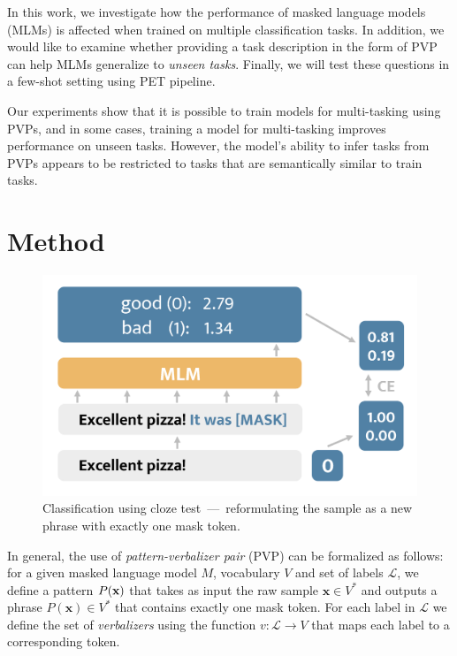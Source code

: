 \documentclass[11pt,a4paper]{article}
\begin{document}
In this work, we investigate how the performance of masked language models (MLMs) is affected when trained on multiple classification tasks.
In addition, we would like to examine whether providing a task description in the form of PVP can help MLMs generalize to \textit{unseen tasks}.
Finally, we will test these questions in a few-shot setting using PET pipeline.

Our experiments show that it is possible to train models for multi-tasking using PVPs,
and in some cases, training a model for multi-tasking improves performance on unseen tasks.
However, the model's ability to infer tasks from PVPs appears to be restricted to tasks that are semantically similar to train tasks.

\section{Method}
\label{sec:method}

\begin{figure}[h]
	\centering
	\includegraphics[width=0.8\linewidth]{mlm_classification}
	\caption{Classification using cloze test~---~reformulating the sample as a new phrase with exactly one mask token.}
	\label{fig:method}
\vspace{-10pt}
\end{figure}

In general, the use of \textit{pattern-verbalizer pair} (PVP) can be formalized as follows: for a given masked language model $M$, vocabulary $V$ and set of labels $\mathcal{L}$, we define a pattern $P(\textbf{\text{x}})$ that takes as input the raw sample $\textbf{x}\in{}V^*$ and outputs a phrase $P(\textbf{x})\in{}V^*$ that contains exactly one mask token.
For each label in $\mathcal{L}$ we define the set of \textit{verbalizers} using the function $v:\mathcal{L}\rightarrow{}V$ that maps each label to a corresponding token.
\end{document}
